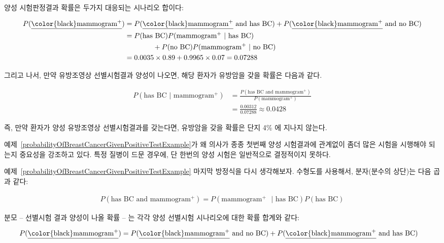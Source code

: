 \begin{example}
양성 시험판정결과 확률은 두가지 대응되는 시나리오 합이다:

\begin{align*}
P(\text{\underline{\color{black}mammogram$^+$}}) &= P(\text{\underline{\color{black}mammogram$^+$} and has BC}) + P(\text{\underline{\color{black}mammogram$^+$} and no BC}) \\
	&= P(\text{has BC})P(\text{mammogram$^+$ } | \text{ has BC}) \\
	&\qquad\qquad	+ P(\text{no BC})P(\text{mammogram$^+$ } | \text{ no BC}) \\
	&= 0.0035\times 0.89 + 0.9965\times 0.07 = 0.07288
\end{align*}

그리고 나서, 만약 유방조영상 선별시험결과 양성이 나오면, 해당 환자가 유방암을 갖을 확률은 다음과 같다.

\begin{align*}
P(\text{has BC } | \text{ mammogram$^+$})
	&= \frac{P(\text{has BC and mammogram$^+$})}{P(\text{mammogram$^+$})}\\
	&= \frac{0.00312}{0.07288} \approx 0.0428
\end{align*}

즉, 만약 환자가 양성 유방조영상 선별시험결과를 갖는다면, 유방암을 갖을 확률은 단지 4\% 에 지나지 않는다.
\end{example}

예제~\ref{probabilityOfBreastCancerGivenPositiveTestExample}가 왜 의사가 종종 첫번째 양성 시험결과에 관계없이 좀더 많은 시험을 시행해야 되는지 중요성을 강조하고 있다. 특정 질병이 드문 경우에, 단 한번의 양성 시험은 일반적으로 결정적이지 못하다.

예제~\ref{probabilityOfBreastCancerGivenPositiveTestExample} 마지막 방정식을 다시 생각해보자. 수형도를 사용해서, 분자(분수의 상단)는 다음 곱과 같다:

\begin{align*}
P(\text{has BC and mammogram$^+$}) = P(\text{mammogram$^+$ } | \text{ has BC})P(\text{has BC})
\end{align*}

분모 -- 선별시험 결과 양성이 나올 확률 -- 는 각각 양성 선별시험 시나리오에 대한 확률 합계와 같다:

\begin{align*}
P(\text{\underline{\color{black}mammogram$^+$}})
	&= P(\text{\underline{\color{black}mammogram$^+$} and no BC})
		+ P(\text{\underline{\color{black}mammogram$^+$} and has BC})
\end{align*}


